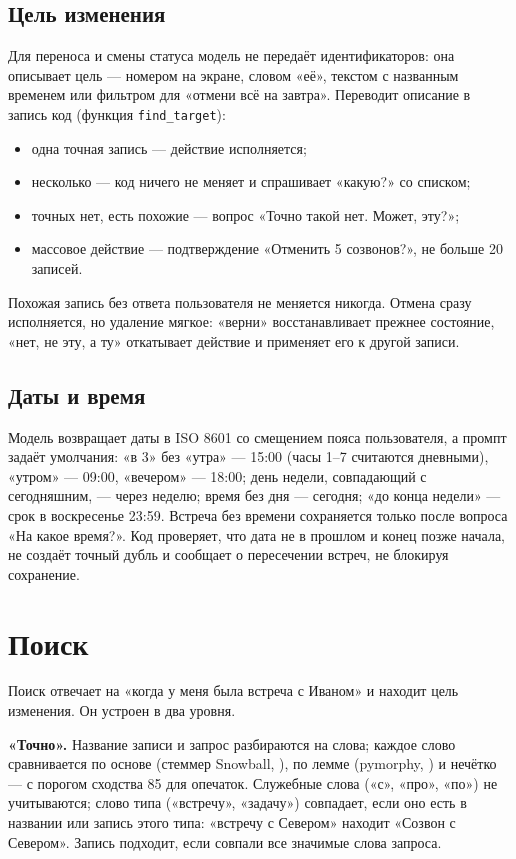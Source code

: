 \documentclass[10pt,a4paper,twocolumn]{article}
\newcommand{\code}[1]{\texttt{#1}}
\begin{document}
\subsection{Цель изменения}

Для переноса и смены статуса модель не передаёт идентификаторов: она описывает цель —
номером на экране, словом «её», текстом с названным временем или фильтром для «отмени
всё на завтра». Переводит описание в запись код (функция \code{find\_target}):
\begin{itemize}
  \item одна точная запись — действие исполняется;
  \item несколько — код ничего не меняет и спрашивает «какую?» со списком;
  \item точных нет, есть похожие — вопрос «Точно такой нет. Может, эту?»;
  \item массовое действие — подтверждение «Отменить 5 созвонов?», не больше 20 записей.
\end{itemize}
Похожая запись без ответа пользователя не меняется никогда. Отмена сразу исполняется,
но удаление мягкое: «верни» восстанавливает прежнее состояние, «нет, не эту, а ту»
откатывает действие и применяет его к другой записи.

\subsection{Даты и время}

Модель возвращает даты в ISO 8601 со смещением пояса пользователя, а промпт задаёт
умолчания: «в 3» без «утра» — 15:00 (часы 1–7 считаются дневными), «утром» — 09:00,
«вечером» — 18:00; день недели, совпадающий с сегодняшним, — через неделю; время без
дня — сегодня; «до конца недели» — срок в воскресенье 23:59. Встреча без времени
сохраняется только после вопроса «На какое время?». Код проверяет, что дата не в
прошлом и конец позже начала, не создаёт точный дубль и сообщает о пересечении встреч,
не блокируя сохранение.

\section{Поиск}

Поиск отвечает на «когда у меня была встреча с Иваном» и находит цель изменения.
Он устроен в два уровня.

\textbf{«Точно».} Название записи и запрос разбираются на слова; каждое слово
сравнивается по основе (стеммер Snowball, \citealp{porter2001snowball}), по лемме
(pymorphy, \citealp{korobov2015morphological}) и нечётко — с порогом сходства 85 для
опечаток. Служебные слова («с», «про», «по») не учитываются; слово типа («встречу»,
«задачу») совпадает, если оно есть в названии или запись этого типа: «встречу с Севером»
находит «Созвон с Севером». Запись подходит, если совпали все значимые слова запроса.
\end{document}

